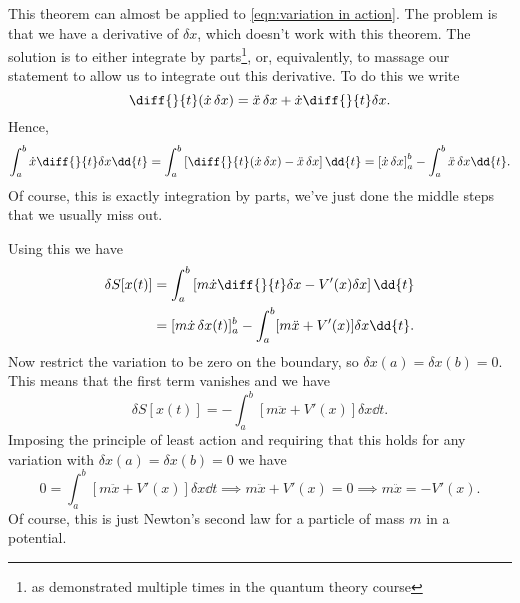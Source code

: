 \documentclass[fleqn]{NotesClass}
\begin{document}
    This theorem can almost be applied to \cref{eqn:variation in action}.
    The problem is that we have a derivative of \(\delta x\), which doesn't work with this theorem.
    The solution is to either integrate by parts\footnote{as demonstrated multiple times in the quantum theory course}, or, equivalently, to massage our statement to allow us to integrate out this derivative.
    To do this we write
    \begin{equation}
        \diff{}{t} (\dot{x} \, \delta x) = \ddot{x} \, \delta x + \dot{x} \diff{}{t}\delta x.
    \end{equation}
    Hence,
    \begin{equation}
        \int_a^b \dot{x}\diff{}{t}\delta x \dd{t} = \int_a^b \left[ \diff{}{t}(\dot{x} \, \delta x) - \ddot{x} \, \delta x \right] \dd{t} = \left[ \dot{x} \, \delta x \right]_a^b - \int_a^b \ddot{x} \, \delta x \dd{t}.
    \end{equation}
    Of course, this is exactly integration by parts, we've just done the middle steps that we usually miss out.
    
    Using this we have
    \begin{align}
        \delta S[x(t)] &= \int_a^b \left[ m\dot{x} \diff{}{t}\delta x - V'(x)\delta x \right]\dd{t}\\
        &= [m\dot{x} \, \delta x(t)]_a^b - \int_a^b [m\ddot{x} + V'(x)]\delta x \dd{t}.
    \end{align}
    Now restrict the variation to be zero on the boundary, so \(\delta x(a) = \delta x(b) = 0\).
    This means that the first term vanishes and we have
    \begin{equation}
        \delta S[x(t)] = -\int_a^b [m \ddot{x} + V'(x)] \delta x \dd{t}.
    \end{equation}
    Imposing the principle of least action and requiring that this holds for any variation with \(\delta x(a) = \delta x(b) = 0\) we have
    \begin{equation}
        0 = \int_a^b [m\ddot{x} + V'(x)] \delta x \dd{t} \implies m\ddot{x} + V'(x) = 0 \implies m\ddot{x} = -V'(x).
    \end{equation}
    Of course, this is just Newton's second law for a particle of mass \(m\) in a potential.
    
\end{document}
